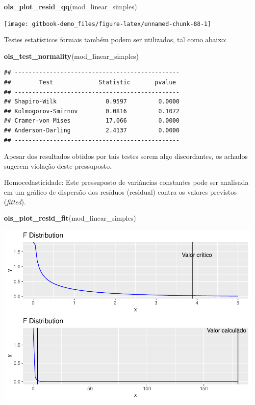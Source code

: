 \documentclass[
]{book}
\newenvironment{Shaded}{\begin{snugshade}}{\end{snugshade}}
\newcommand{\KeywordTok}[1]{\textcolor[rgb]{0.13,0.29,0.53}{\textbf{#1}}}
\newcommand{\NormalTok}[1]{#1}
\begin{document}
\begin{Shaded}
\begin{Highlighting}[]
\KeywordTok{ols_plot_resid_qq}\NormalTok{(mod_linear_simples)}
\end{Highlighting}
\end{Shaded}

\begin{center}\texttt{[image: gitbook-demo\_files/figure-latex/unnamed-chunk-88-1]} \end{center}

Testes estatísticos formais também podem ser utilizados, tal como abaixo:

\begin{Shaded}
\begin{Highlighting}[]
\KeywordTok{ols_test_normality}\NormalTok{(mod_linear_simples)}
\end{Highlighting}
\end{Shaded}

\begin{verbatim}
## -----------------------------------------------
##        Test             Statistic       pvalue  
## -----------------------------------------------
## Shapiro-Wilk              0.9597         0.0000 
## Kolmogorov-Smirnov        0.0816         0.1072 
## Cramer-von Mises          17.066         0.0000 
## Anderson-Darling          2.4137         0.0000 
## -----------------------------------------------
\end{verbatim}

Apesar dos resultados obtidos por tais testes serem algo discordantes, os achados sugerem violação deste pressuposto.

Homocedasticidade: Este pressuposto de variâncias constantes pode ser analisada em um gráfico de dispersão dos resíduos (residual) contra os valores previstos (\emph{fitted}).

\begin{Shaded}
\begin{Highlighting}[]
\KeywordTok{ols_plot_resid_fit}\NormalTok{(mod_linear_simples)}
\end{Highlighting}
\end{Shaded}

\begin{center}\includegraphics{gitbook-demo_files/figure-latex/unnamed-chunk-90-1} \end{center}
\end{document}
